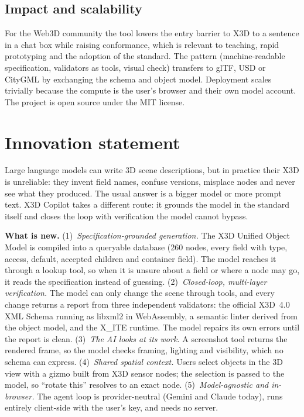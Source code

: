 \documentclass[10pt,a4paper]{article}
\begin{document}
\subsection{Impact and scalability}
For the Web3D community the tool lowers the entry barrier to X3D to a sentence in a chat box while raising conformance, which is relevant to teaching, rapid prototyping and the adoption of the standard. The pattern (machine-readable specification, validators as tools, visual check) transfers to glTF, USD or CityGML by exchanging the schema and object model. Deployment scales trivially because the compute is the user's browser and their own model account. The project is open source under the MIT license.

\section{Innovation statement}
Large language models can write 3D scene descriptions, but in practice their X3D is unreliable: they invent field names, confuse versions, misplace nodes and never see what they produced. The usual answer is a bigger model or more prompt text. X3D Copilot takes a different route: it grounds the model in the standard itself and closes the loop with verification the model cannot bypass.

\textbf{What is new.} (1)~\emph{Specification-grounded generation.} The X3D Unified Object Model is compiled into a queryable database (260 nodes, every field with type, access, default, accepted children and container field). The model reaches it through a lookup tool, so when it is unsure about a field or where a node may go, it reads the specification instead of guessing. (2)~\emph{Closed-loop, multi-layer verification.} The model can only change the scene through tools, and every change returns a report from three independent validators: the official X3D~4.0 XML Schema running as libxml2 in WebAssembly, a semantic linter derived from the object model, and the X\_ITE runtime. The model repairs its own errors until the report is clean. (3)~\emph{The AI looks at its work.} A screenshot tool returns the rendered frame, so the model checks framing, lighting and visibility, which no schema can express. (4)~\emph{Shared spatial context.} Users select objects in the 3D view with a gizmo built from X3D sensor nodes; the selection is passed to the model, so ``rotate this'' resolves to an exact node. (5)~\emph{Model-agnostic and in-browser.} The agent loop is provider-neutral (Gemini and Claude today), runs entirely client-side with the user's key, and needs no server.
\end{document}
